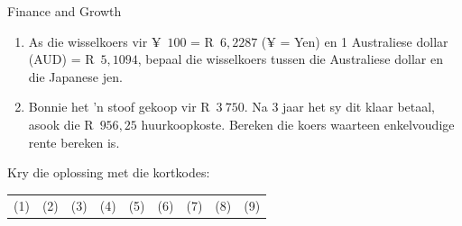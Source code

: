 \begin{eocexercises}{Finance and Growth}
\begin{enumerate}[label=\textbf{\arabic*}.]
	\item As die wisselkoers vir ¥~$100$ = R~$6,2287$ (¥ = Yen) en 1 Australiese dollar (AUD) = R~$5,1094$, bepaal die wisselkoers
tussen die Australiese dollar en die Japanese jen.
	\item Bonnie het ’n stoof gekoop vir R~$3~750$. Na 3 jaar het sy dit klaar betaal, asook die R~$956,25$ huurkoopkoste.
Bereken die koers waarteen enkelvoudige rente bereken is.
    \end{enumerate}

    Kry die oplossing met die kortkodes:\\
    \begin{tabularx}{\textwidth}{ XXXXXXXXX }
	(1) & (2) & (3) & (4) & (5) & (6) & (7) & (8) & (9)\\
    \end{tabularx}
\end{eocexercises}
